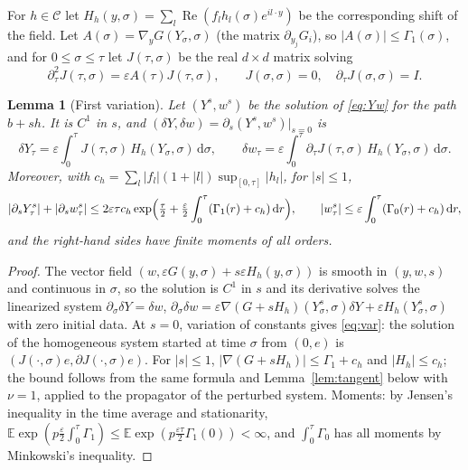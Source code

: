 \documentclass[11pt]{article}
\newcommand{\dd}{\mathrm{d}}
\newcommand{\E}{\mathbb{E}}
\newcommand{\eps}{\varepsilon}
\renewcommand{\Re}{\operatorname{Re}}
\newtheorem{lemma}[theorem]{Lemma}
\theoremstyle{remark}
\begin{document}
For $h\in\mathcal{C}$ let $H_h(y,\sigma) = \sum_l\Re(f_lh_l(\sigma)e^{il\cdot y})$
be the corresponding shift of the field. Let
$A(\sigma) = \nabla_yG(Y_\sigma,\sigma)$ (the matrix
$\partial_{y_j}G_i$), so $|A(\sigma)|\le\Gamma_1(\sigma)$, and for
$0\le\sigma\le\tau$ let $J(\tau,\sigma)$ be the real $d\times d$ matrix
solving
\begin{equation}
  \partial_\tau^2J(\tau,\sigma) = \eps A(\tau)J(\tau,\sigma),\qquad
  J(\sigma,\sigma) = 0,\quad\partial_\tau J(\sigma,\sigma) = I .
  \label{eq:J}
\end{equation}

\begin{lemma}[First variation]\label{lem:var}
Let $(Y^s,w^s)$ be the solution of \eqref{eq:Yw} for the path $b+sh$. It is
$C^1$ in $s$, and $(\delta Y,\delta w) = \partial_s(Y^s,w^s)|_{s=0}$ is
\begin{equation}
  \delta Y_\tau = \eps\int_0^\tau J(\tau,\sigma)\,H_h(Y_\sigma,\sigma)\,\dd\sigma,
  \qquad
  \delta w_\tau = \eps\int_0^\tau\partial_\tau J(\tau,\sigma)\,H_h(Y_\sigma,\sigma)\,\dd\sigma .
  \label{eq:var}
\end{equation}
Moreover, with $c_h = \sum_l|f_l|(1+|l|)\sup_{[0,\tau]}|h_l|$, for $|s|\le1$,
\[
  |\partial_sY^s_\tau| + |\partial_sw^s_\tau|
  \le 2\eps\tau c_h\exp\Bigl(\tfrac{\tau}{2}
     + \tfrac{\eps}{2}\int_0^\tau(\Gamma_1(r)+c_h)\,\dd r\Bigr),
  \qquad
  |w^s_\tau|\le\eps\int_0^\tau(\Gamma_0(r)+c_h)\,\dd r ,
\]
and the right-hand sides have finite moments of all orders.
\end{lemma}

\begin{proof}
The vector field $(w,\eps G(y,\sigma)+s\eps H_h(y,\sigma))$ is smooth in
$(y,w,s)$ and continuous in $\sigma$, so the solution is $C^1$ in $s$ and
its derivative solves the linearized system
$\partial_\sigma\delta Y = \delta w$,
$\partial_\sigma\delta w = \eps\nabla(G+sH_h)(Y^s_\sigma,\sigma)\delta Y
+ \eps H_h(Y^s_\sigma,\sigma)$ with zero initial data. At $s=0$, variation
of constants gives \eqref{eq:var}: the solution of the homogeneous system
started at time $\sigma$ from $(0,e)$ is $(J(\cdot,\sigma)e,\partial J(\cdot,\sigma)e)$.
For $|s|\le1$, $|\nabla(G+sH_h)|\le\Gamma_1+c_h$ and $|H_h|\le c_h$; the
bound follows from the same formula and Lemma~\ref{lem:tangent} below with
$\nu=1$, applied to the propagator of the perturbed system. Moments: by
Jensen's inequality in the time average and stationarity,
$\E\exp(p\frac\eps2\int_0^\tau\Gamma_1)\le\E\exp(p\frac{\eps\tau}{2}\Gamma_1(0))<\infty$,
and $\int_0^\tau\Gamma_0$ has all moments by Minkowski's inequality.
\end{proof}
\end{document}
